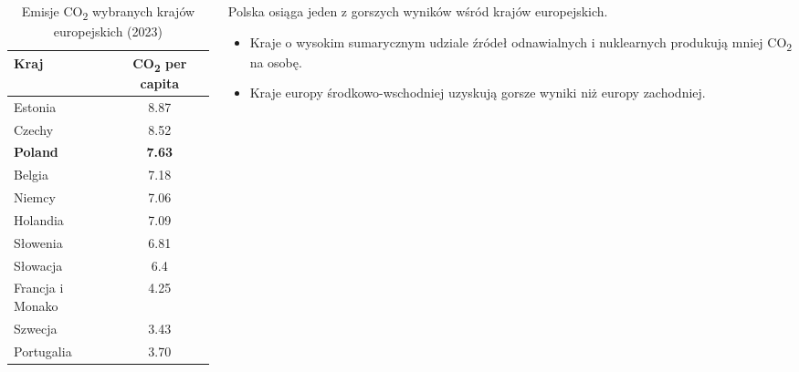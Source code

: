 \begin{columns}[T]
    \begin{column}{0.6\textwidth}
        \begin{table}[h]
            \footnotesize
            \begin{tabular}{lc}
                \toprule
                \textbf{Kraj} & \textbf{CO\textsubscript{2} per capita} \\
                \midrule
                Estonia & 8.87 \\
                Czechy & 8.52 \\
                \textcolor{renewable}{\textbf{Poland}} & \textcolor{renewable}{\textbf{7.63}} \\
                Belgia & 7.18 \\
                Niemcy & 7.06 \\
                Holandia & 7.09 \\
                Słowenia & 6.81 \\
                Słowacja & 6.4 \\
                Francja i Monako & 4.25 \\
                \rowcolor{green!10}
                Szwecja & 3.43 \\
                \rowcolor{green!10}
                Portugalia & 3.70 \\
                \bottomrule
            \end{tabular}
            \caption{Emisje CO\textsubscript{2} wybranych krajów europejskich (2023)}
        \end{table}
    \end{column}

    \begin{column}{0.4\textwidth}
        \vspace{-2.2em}
        \begin{tcolorbox}[colback=green!10,colframe=green!50!black,title=Wniosek kluczowy]
            Polska osiąga jeden z gorszych wyników wśród krajów europejskich.
        \end{tcolorbox}
        \vspace{-0em}
        \begin{itemize}
            \item \small Kraje o wysokim sumarycznym udziale źródeł odnawialnych i nuklearnych produkują mniej CO\textsubscript{2} na osobę.
            \item Kraje europy środkowo-wschodniej uzyskują gorsze wyniki niż europy zachodniej.
        \end{itemize}
    \end{column}
\end{columns}
